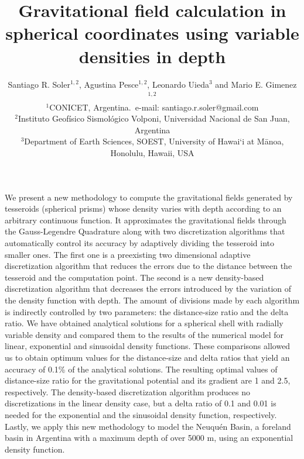 \documentclass[extra, referee]{gji}
\begin{document}
\title[Variable Density Tesseroids]{
    Gravitational field calculation in spherical coordinates using variable
    densities in depth
}
\author[S.R. Soler, A. Pesce, L. Uieda and M.E. Gimenez]{
    Santiago R. Soler$^{1,2}$, Agustina Pesce$^{1,2}$, Leonardo Uieda$^3$ and
    Mario E. Gimenez$^{1,2}$ \\
    $^1$CONICET, Argentina.~e-mail: santiago.r.soler@gmail.com\\
    $^2$Instituto Geofísico Sismológico Volponi, Universidad Nacional de
    San Juan, Argentina\\
    $^3$Department of Earth Sciences, SOEST, University of Hawai‘i at
    M\={a}noa, Honolulu, Hawaii, USA
}


\maketitle

\begin{summary}
We present a new methodology to compute the gravitational fields generated by
tesseroids (spherical prisms) whose density varies with depth according to
an arbitrary continuous function.
It approximates the gravitational fields through the Gauss-Legendre Quadrature along
with two discretization algorithms that automatically control its accuracy by adaptively
dividing the tesseroid into smaller ones.
The first one is a preexisting two dimensional adaptive discretization algorithm that
reduces the errors due to the distance between the tesseroid and the computation point.
The second is a new density-based discretization algorithm that
decreases the errors introduced by the variation of the density function with depth.
The amount of divisions made by each algorithm is indirectly controlled
by two parameters: the distance-size ratio and the delta ratio.
We have obtained analytical solutions for a spherical shell with radially variable
density and compared them to the results of the numerical model for linear,
exponential and sinusoidal density functions.
These comparisons allowed us to obtain optimum values for the distance-size and
delta ratios that yield an accuracy of 0.1\% of the analytical solutions.
The resulting optimal values of distance-size ratio for the gravitational potential and
its gradient are 1 and 2.5, respectively.
The density-based discretization algorithm produces no discretizations in the linear
density case, but a delta ratio of 0.1 and 0.01 is needed for the exponential and the
sinusoidal density function, respectively.
Lastly, we apply this new methodology to model the Neuqu\'en Basin, a foreland basin in
Argentina with a maximum depth of over 5000 m, using an exponential density function.
\end{summary}
\end{document}
